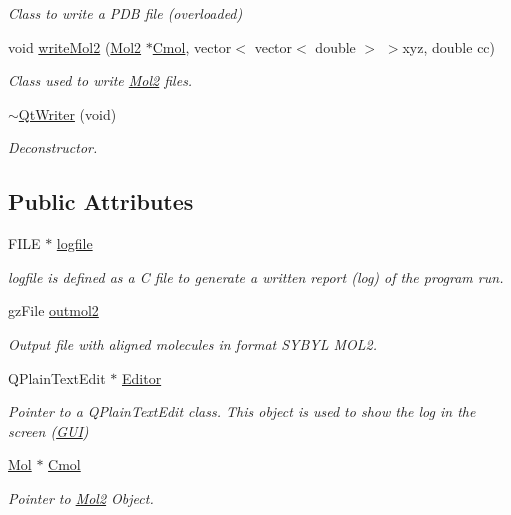 \begin{DoxyCompactItemize}
\begin{DoxyCompactList}\small\item\em Class to write a PDB file (overloaded) \end{DoxyCompactList}\item 
void \hyperlink{classQtWriter_a12261d1488b5a7e0ff64d3326842c04c}{writeMol2} (\hyperlink{classMol2}{Mol2} $\ast$\hyperlink{classQtWriter_a82288bebcd187b80b54c2093da0ea820}{Cmol}, vector$<$ vector$<$ double $>$ $>$xyz, double cc)
\begin{DoxyCompactList}\small\item\em Class used to write \hyperlink{classMol2}{Mol2} files. \end{DoxyCompactList}\item 
\hyperlink{classQtWriter_a255879a3ac447bd5e481042e73f33974}{$\sim$QtWriter} (void)
\begin{DoxyCompactList}\small\item\em Deconstructor. \end{DoxyCompactList}\end{DoxyCompactItemize}
\subsection*{Public Attributes}
\begin{DoxyCompactItemize}
\item 
FILE $\ast$ \hyperlink{classQtWriter_a044bb96d71354b34c4a6ba47c3461d42}{logfile}
\begin{DoxyCompactList}\small\item\em logfile is defined as a C file to generate a written report (log) of the program run. \end{DoxyCompactList}\item 
gzFile \hyperlink{classQtWriter_a41ae23e5a7e0c18505f3a7c654c672b7}{outmol2}
\begin{DoxyCompactList}\small\item\em Output file with aligned molecules in format SYBYL MOL2. \end{DoxyCompactList}\item 
QPlainTextEdit $\ast$ \hyperlink{classQtWriter_a2acbd598dd08378981f929a023ef5d41}{Editor}
\begin{DoxyCompactList}\small\item\em Pointer to a QPlainTextEdit class. This object is used to show the log in the screen (\hyperlink{classGUI}{GUI}) \end{DoxyCompactList}\item 
\hyperlink{classMol}{Mol} $\ast$ \hyperlink{classQtWriter_a82288bebcd187b80b54c2093da0ea820}{Cmol}
\begin{DoxyCompactList}\small\item\em Pointer to \hyperlink{classMol2}{Mol2} Object. \end{DoxyCompactList}\end{DoxyCompactItemize}


